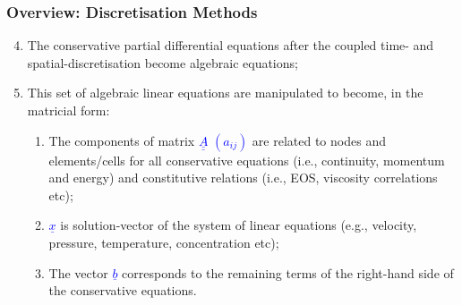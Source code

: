 \documentclass[10pt,compress]{beamer}
\begin{document}
\begin{frame}
 \frametitle{Overview: Discretisation Methods} 
\begin{enumerate}
  \setcounter{enumi}{3}
  \item <1-> The conservative partial differential equations after the coupled time- and spatial-discretisation become algebraic equations;
  \item <2-> This set of algebraic linear equations are manipulated to become, in the matricial form:
      \begin{enumerate}
         \item<3-> The components of matrix \textcolor{blue}{$\underline{\underline{A}}$ $\left(a_{ij}\right)$} are related to nodes and elements/cells for all conservative equations (i.e., continuity, momentum and energy) and constitutive relations (i.e., EOS, viscosity correlations etc);
         \item<4-> \textcolor{blue}{$\underline{x}$} is solution-vector of the system of linear equations (e.g., velocity, pressure, temperature, concentration etc);
         \item <5-> The vector \textcolor{blue}{$\underline{b}$} corresponds to the remaining terms of the right-hand side of the conservative equations.
      \end{enumerate}
\end{enumerate}

\end{frame}
\end{document}
